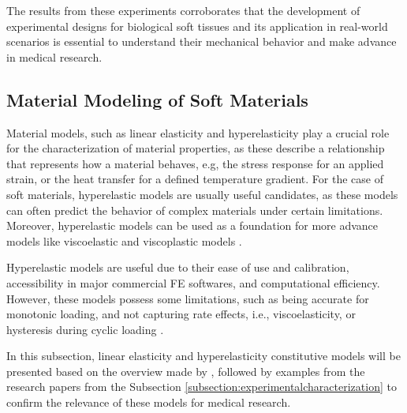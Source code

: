 The results from these experiments corroborates that the development of experimental designs for
biological soft tissues and its application in real-world scenarios is essential to understand 
their mechanical behavior and make advance in medical research.

\subsection{Material Modeling of Soft Materials}
\label{subsection:materialmodeling} 

Material models, such as linear elasticity and hyperelasticity play a crucial role for the characterization 
of material properties, as these describe a relationship that represents how a material behaves, e.g, 
the stress response for an applied strain, or the heat transfer for a defined temperature gradient.
For the case of soft materials, hyperelastic models are usually 
useful candidates, as these models can often predict the behavior of complex materials under certain limitations.
Moreover, hyperelastic models can be used as a foundation for more advance models like 
viscoelastic and viscoplastic models \cite{Bergström2015}. 

Hyperelastic models are useful due to their ease of use and calibration, accessibility in major commercial FE softwares, 
and computational efficiency. However, these models possess some limitations, such as being 
accurate for monotonic loading, and not capturing rate effects, i.e., viscoelasticity, or 
hysteresis during cyclic loading \cite{Bergström2015}.

In this subsection, linear elasticity and hyperelasticity constitutive models will be presented 
based on the overview made by \citet{Bergström2015}, followed by examples from the research 
papers from the Subsection \ref{subsection:experimentalcharacterization} to confirm the relevance of these 
models for medical research.

